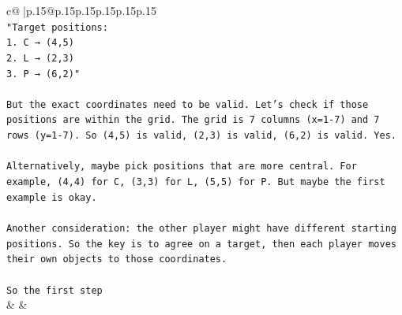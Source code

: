 \documentclass{article}
\begin{document}
{\begin{supertabular}{c@{$\;$}|p{.15\linewidth}@{}p{.15\linewidth}p{.15\linewidth}p{.15\linewidth}p{.15\linewidth}p{.15\linewidth}}
{{{\\ 
\texttt{"Target positions:} \\
\texttt{1. C → (4,5)} \\
\texttt{2. L → (2,3)} \\
\texttt{3. P → (6,2)"} \\
\\ 
\texttt{But the exact coordinates need to be valid. Let's check if those positions are within the grid. The grid is 7 columns (x=1{-}7) and 7 rows (y=1{-}7). So (4,5) is valid, (2,3) is valid, (6,2) is valid. Yes.} \\
\\ 
\texttt{Alternatively, maybe pick positions that are more central. For example, (4,4) for C, (3,3) for L, (5,5) for P. But maybe the first example is okay.} \\
\\ 
\texttt{Another consideration: the other player might have different starting positions. So the key is to agree on a target, then each player moves their own objects to those coordinates.} \\
\\ 
\texttt{So the first step} \\
            }
        }
    }
    & & \\ \\


\end{supertabular}}
\end{document}
